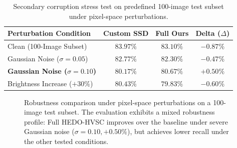\documentclass[journal]{IEEEtran}
\begin{document}
\begin{table}[!t]
\centering
\caption{Secondary corruption stress test on predefined 100-image test subset under pixel-space perturbations.}
\label{tab:robustness}
\begin{tabular}{lccc}
\toprule
\textbf{Perturbation Condition} & \textbf{Custom SSD} & \textbf{Full Ours} & \textbf{Delta ($\Delta$)} \\
\midrule
Clean (100-Image Subset) & $83.97\%$ & $83.10\%$ & $-0.87\%$ \\
Gaussian Noise ($\sigma=0.05$) & $82.77\%$ & $82.30\%$ & $-0.47\%$ \\
\textbf{Gaussian Noise ($\sigma=0.10$)} & $80.17\%$ & $\mathbf{80.67\%}$ & $\mathbf{+0.50\%}$ \\
Brightness Increase ($+30\%$) & $80.43\%$ & $79.83\%$ & $-0.60\%$ \\
\bottomrule
\end{tabular}
\end{table}

\begin{figure}[!t]
\centering
{}
\caption{Robustness comparison under pixel-space perturbations on a 100-image test subset. The evaluation exhibits a mixed robustness profile: Full HEDO-HVSC improves over the baseline under severe Gaussian noise ($\sigma=0.10, +0.50\%$), but achieves lower recall under the other tested conditions.}
\label{fig:robustness}
\end{figure}
\end{document}
